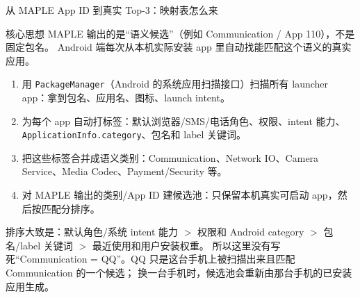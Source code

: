 \documentclass[UTF8,aspectratio=169,10pt]{ctexbeamer}
\newcommand{\code}[1]{\texttt{\small #1}}
\begin{document}
\begin{frame}{从 MAPLE App ID 到真实 Top-3：映射表怎么来}
  \small
  \begin{block}{核心思想}
    MAPLE 输出的是“语义候选”（例如 Communication / App 110），不是固定包名。
    Android 端每次从本机实际安装 app 里自动找能匹配这个语义的真实应用。
  \end{block}
  \begin{enumerate}
    \item 用 \code{PackageManager}（Android 的系统应用扫描接口）扫描所有 launcher app：拿到包名、应用名、图标、launch intent。
    \item 为每个 app 自动打标签：默认浏览器/SMS/电话角色、权限、intent 能力、\code{ApplicationInfo.category}、包名和 label 关键词。
    \item 把这些标签合并成语义类别：Communication、Network IO、Camera Service、Media Codec、Payment/Security 等。
    \item 对 MAPLE 输出的类别/App ID 建候选池：只保留本机真实可启动 app，然后按匹配分排序。
  \end{enumerate}
  \vspace{0.25em}
  {\scriptsize
  排序大致是：默认角色/系统 intent 能力 \(>\) 权限和 Android category \(>\) 包名/label 关键词 \(>\) 最近使用和用户安装权重。
  所以这里没有写死“Communication = QQ”。QQ 只是这台手机上被扫描出来且匹配 Communication 的一个候选；
  换一台手机时，候选池会重新由那台手机的已安装应用生成。
  }
\end{frame}
\end{document}
